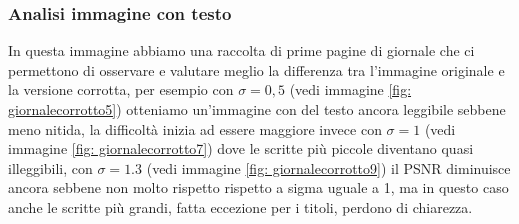 \subsubsection{Analisi immagine con testo}
In questa immagine abbiamo una raccolta di prime pagine di giornale che ci permettono di osservare e valutare 
meglio la differenza tra l'immagine originale e la versione corrotta, per esempio con $\sigma = 0,5$ (vedi immagine \ref{fig: giornalecorrotto5}) 
otteniamo un'immagine con del testo ancora leggibile sebbene meno nitida, la difficoltà inizia ad essere maggiore invece con 
$\sigma = 1$ (vedi immagine \ref{fig: giornalecorrotto7}) dove le scritte più piccole diventano quasi illeggibili, con $\sigma = 1.3$ 
(vedi immagine \ref{fig: giornalecorrotto9}) il PSNR diminuisce ancora sebbene non molto rispetto rispetto a sigma uguale a 1, ma in questo caso anche le scritte più grandi, fatta 
eccezione per i titoli, perdono di chiarezza. 

